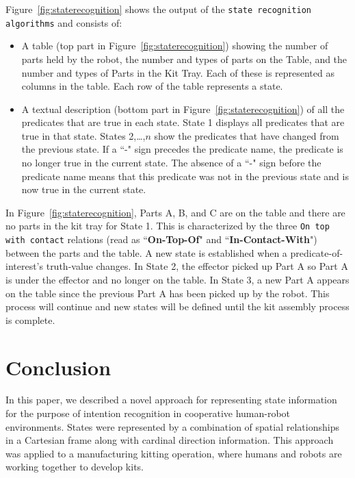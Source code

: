 \documentclass[final,1p,times]{elsarticle}
\begin{document}
Figure~\ref{fig:staterecognition} shows the output of the \texttt{state recognition algorithms} and consists of:
\begin{itemize}
 \item A table (top part in Figure~\ref{fig:staterecognition}) showing the number of parts held by the robot, the number and types of parts on the Table, and the number and types of Parts in the Kit Tray. Each of these is represented as columns in the table. Each row of the table represents a state.
 \item A textual description (bottom part in Figure~\ref{fig:staterecognition}) of all the predicates that are true in each state. State 1 displays all predicates that are true in that state. States 2,\ldots,$n$ show the predicates that have changed from the previous state. If a ``-" sign precedes the predicate name, the predicate is no longer true in the current state. The absence of a ``-" sign before the predicate name means that this predicate was not in the previous state and is now true in the current state.
\end{itemize}

In Figure~\ref{fig:staterecognition}, Parts A, B, and C are on the table and there are no parts in the kit tray for State 1. This is characterized by the three \texttt{On top with contact} relations (read as ``\textbf{On-Top-Of}" and ``\textbf{In-Contact-With}") between the parts and the table. A new state is established when a predicate-of-interest's truth-value changes. In State 2, the effector picked up Part A so Part A is under the effector and no longer on the table. In State 3, a new Part A appears on the table since the previous Part A has been picked up by the robot. This process will continue and new states will be defined until the kit assembly process is complete.



\section{Conclusion}\label{S:section6}
In this paper, we described a novel approach for representing state information for the purpose of intention recognition in cooperative human-robot environments. States were represented by a combination of spatial relationships in a Cartesian frame along with cardinal direction information. This approach was applied to a manufacturing kitting operation, where humans and robots are working together to develop kits.
\end{document}
